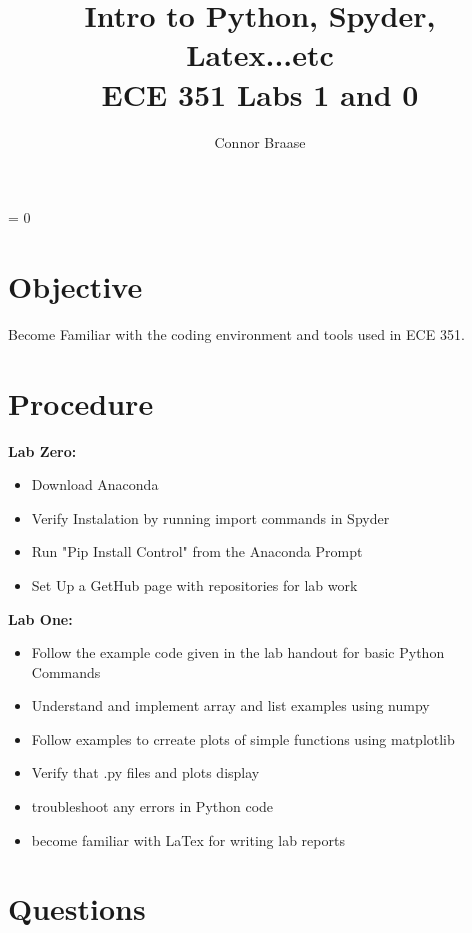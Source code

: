 \title{Intro to Python, Spyder, Latex...etc \\ ECE 351 Labs 1 and 0}
\author{Connor Braase}


\vspace{\fill}
\maketitle
\vspace{\fill}
\clearpage
\parindent = 0

\section*{Objective}
Become Familiar with the coding environment and tools used in ECE 351. \\
\section*{Procedure}
\textbf{Lab Zero:}
\begin{itemize}
  \item Download Anaconda 
  \item Verify Instalation by running import commands in Spyder
  \item  Run "Pip Install Control" from the Anaconda Prompt 
  \item Set Up a GetHub page with repositories for lab work
  
\end{itemize}

\textbf{Lab One:}
\begin{itemize}
  \item  Follow the example code given in the lab handout for basic  Python Commands
  \item Understand and implement array and list examples using numpy 
 
  \item  Follow examples to crreate plots of simple functions using matplotlib
  \item Verify that .py files and plots display 
  \item troubleshoot any errors in Python code 
  \item become familiar with LaTex for writing lab reports 
  
\end{itemize}
\section*{Questions}


